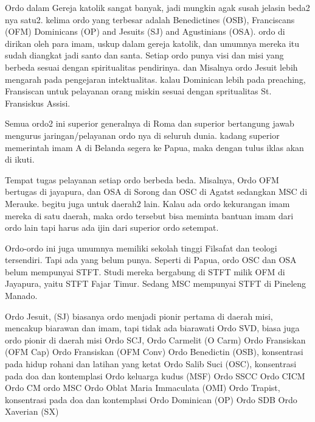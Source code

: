 Ordo dalam Gereja katolik sangat banyak, jadi mungkin agak susah jelasin beda2 nya satu2. kelima ordo yang terbesar adalah Benedictines (OSB), Franciscans (OFM) Dominicans (OP) and Jesuits (SJ) and Agustinians (OSA). ordo di dirikan oleh para imam, uskup dalam gereja katolik, dan umumnya mereka itu sudah diangkat jadi santo dan santa. Setiap ordo punya visi dan misi yang berbeda sesuai dengan spiritualitas pendirinya. dan Misalnya ordo Jesuit lebih mengarah pada pengejaran intektualitas. kalau Dominican lebih pada preaching, Fransiscan untuk pelayanan orang miskin sesuai dengan spritualitas St. Fransiskus Assisi.

Semua ordo2 ini superior generalnya di Roma dan superior bertangung jawab mengurus jaringan/pelayanan ordo nya di seluruh dunia. kadang superior memerintah imam A di Belanda segera ke Papua, maka dengan tulus iklas akan di ikuti.

Tempat tugas pelayanan setiap ordo berbeda beda. Misalnya, Ordo OFM bertugas di jayapura, dan OSA di Sorong dan OSC di Agatst sedangkan MSC di Merauke. begitu juga untuk daerah2 lain. Kalau ada ordo kekurangan imam mereka di satu daerah, maka ordo tersebut bisa meminta bantuan imam dari ordo lain tapi harus ada ijin dari superior ordo setempat.

Ordo-ordo ini juga umumnya memiliki sekolah tinggi Filsafat dan teologi tersendiri. Tapi ada yang belum punya. Seperti di Papua, ordo OSC dan OSA belum mempunyai STFT. Studi mereka bergabung di STFT milik OFM di Jayapura, yaitu STFT Fajar Timur. Sedang MSC mempunyai STFT di Pineleng Manado.

Ordo Jesuit, (SJ) biasanya ordo menjadi pionir pertama di daerah misi, mencakup biarawan dan imam, tapi tidak ada biarawati
Ordo SVD, biasa juga ordo pionir di daerah misi
Ordo SCJ,
Ordo Carmelit (O Carm)
Ordo Fransiskan (OFM Cap)
Ordo Fransiskan (OFM Conv)
Ordo Benedictin (OSB), konsentrasi pada hidup rohani dan latihan yang ketat
Ordo Salib Suci (OSC), konsentrasi pada doa dan kontemplasi
Ordo keluarga kudus (MSF)
Ordo SSCC
Ordo CICM
Ordo CM
ordo MSC
Ordo Oblat Maria Immaculata (OMI)
Ordo Trapist, konsentrasi pada doa dan kontemplasi
Ordo Dominican (OP)
Ordo SDB
Ordo Xaverian (SX)
